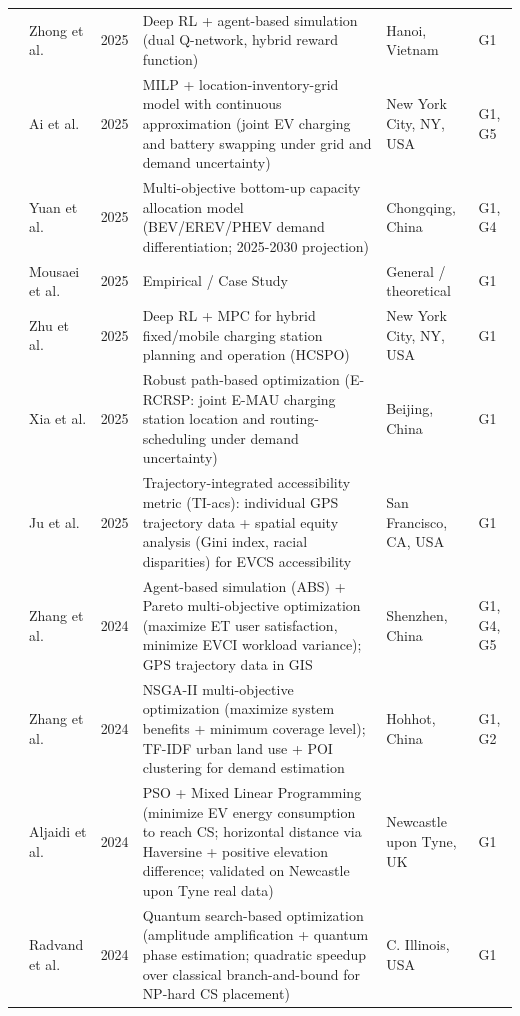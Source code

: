 \documentclass[letterpaper, 12pt, oneside, doublespacing]{Thesis}
\begin{document}
\begin{longtable}{L{0.9cm} L{2.2cm} L{0.8cm} L{3.3cm} L{2.5cm} L{1.5cm}}
\cite{optimizing_electric_2025} & Zhong et al. & 2025 & Deep RL + agent-based simulation (dual Q-network, hybrid reward function) & Hanoi, Vietnam & G1 \\
\cite{optimizing_urban_2025} & Ai et al. & 2025 & MILP + location-inventory-grid model with continuous approximation (joint EV charging and battery swapping under grid and demand uncertainty) & New York City, NY, USA & G1, G5 \\
\cite{planning_future_2025} & Yuan et al. & 2025 & Multi-objective bottom-up capacity allocation model (BEV/EREV/PHEV demand differentiation; 2025-2030 projection) & Chongqing, China & G1, G4 \\
\cite{predicting_optimal_2025} & Mousaei et al. & 2025 & Empirical / Case Study & General {\slash} theoretical & G1 \\
\cite{reinforcement_learning_2025} & Zhu et al. & 2025 & Deep RL + MPC for hybrid fixed/mobile charging station planning and operation (HCSPO) & New York City, NY, USA & G1 \\
\cite{robust_charging_2025} & Xia et al. & 2025 & Robust path-based optimization (E-RCRSP: joint E-MAU charging station location and routing-scheduling under demand uncertainty) & Beijing, China & G1 \\
\cite{trajectory-integrated_accessibility_2025} & Ju et al. & 2025 & Trajectory-integrated accessibility metric (TI-acs): individual GPS trajectory data + spatial equity analysis (Gini index, racial disparities) for EVCS accessibility & San Francisco, CA, USA & G1 \\
\cite{a_data-driven_2024} & Zhang et al. & 2024 & Agent-based simulation (ABS) + Pareto multi-objective optimization (maximize ET user satisfaction, minimize EVCI workload variance); GPS trajectory data in GIS & Shenzhen, China & G1, G4, G5 \\
\cite{a_multi-objective_2024} & Zhang et al. & 2024 & NSGA-II multi-objective optimization (maximize system benefits + minimum coverage level); TF-IDF urban land use + POI clustering for demand estimation & Hohhot, China & G1, G2 \\
\cite{a_particle_2024} & Aljaidi et al. & 2024 & PSO + Mixed Linear Programming (minimize EV energy consumption to reach CS; horizontal distance via Haversine + positive elevation difference; validated on Newcastle upon Tyne real data) & Newcastle upon Tyne, UK & G1 \\
\cite{a_quantum_2024} & Radvand et al. & 2024 & Quantum search-based optimization (amplitude amplification + quantum phase estimation; quadratic speedup over classical branch-and-bound for NP-hard CS placement) & C. Illinois, USA & G1 \\

\end{longtable}
\end{document}
